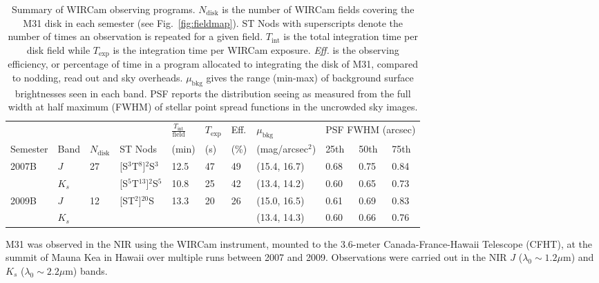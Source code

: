 \documentclass[iop]{emulateapj}
\newcommand{\Fig}[1]{Fig.~\ref{fig:#1}}  %
\begin{document}
\begin{table}[t]
\caption[Summary of WIRCam observing programs]{Summary of WIRCam observing programs.
$N_\mathrm{disk}$ is the number of WIRCam fields covering the M31 disk in each semester (see \Fig{fieldmap}).
ST Nods with superscripts denote the number of times an observation is repeated for a given field.
$T_\mathrm{int}$ is the total integration time per disk field while $T_\mathrm{exp}$ is the integration time per WIRCam exposure.
\emph{Eff.} is the observing efficiency, or percentage of time in a program allocated to integrating the disk of M31, compared to nodding, read out and sky overheads.
$\mu_\mathrm{bkg}$ gives the range (min-max) of background surface brightnesses seen in each band.
PSF reports the distribution seeing as measured from the full width at half maximum (FWHM) of stellar point spread functions in the uncrowded sky images.}
\label{tab:obssummary}
    
    \centering
    \begin{tabular}{lllllllllll}
        & & & & $\frac{T_\mathrm{int}}{\mathrm{field}}$ & $T_\mathrm{exp}$ & Eff. & $\mu_\mathrm{bkg}$ & \multicolumn{3}{c}{PSF FWHM (arcsec)} \\ \cline{9-11}
    Semester & Band & $N_\mathrm{disk}$ & ST Nods & (min) &  (s) &  (\%) & (mag/arcsec$^2$) & 25th  & 50th & 75th \\
    \hline
    \multirow{2}{*}{2007B} & $J$ & \multirow{2}{*}{27} & [S$^3$T$^8$]$^{2}$S$^3$ & 12.5 & 47 & 49 & (15.4, 16.7) & 0.68 & 0.75 & 0.84 \\
     & $K_s$ &  & [S$^5$T$^{13}$]${^2}$S$^5$ & 10.8 & 25 & 42 & (13.4, 14.2) & 0.60 &  0.65 & 0.73 \\
     \hline
     \multirow{2}{*}{2009B} & $J$ & \multirow{2}{*}{12} & \multirow{2}{*}{[ST$^2$]$^{20}$S} & \multirow{2}{*}{13.3} & \multirow{2}{*}{20} & \multirow{2}{*}{26} & (15.0, 16.5) & 0.61 & 0.69 & 0.83 \\
                            & $K_s$ & & & & & & (13.4, 14.3) & 0.60 & 0.66 & 0.76 \\
    \end{tabular}
\end{table}

M31 was observed in the NIR using the WIRCam instrument, mounted to the 3.6-meter Canada-France-Hawaii Telescope (CFHT), at the summit of Mauna Kea in Hawaii over multiple runs between 2007 and 2009.
Observations were carried out in the NIR $J$ ($\lambda_0 \sim 1.2 \mu\mathrm{m}$) and $K_s$ ($\lambda_0 \sim 2.2 \mu\mathrm{m}$) bands.
\end{document}
